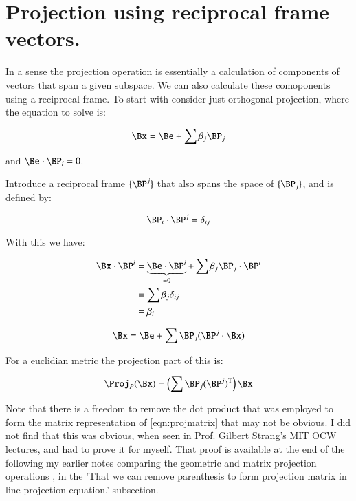 \documentclass{article}      %
\newcommand{\T}[0]{\text{T}}
\begin{document}
\section{ Projection using reciprocal frame vectors. }


In a sense the projection operation is essentially a calculation of components of vectors that span a given subspace.  We can also calculate these comoponents using a reciprocal frame.  To start with consider
just orthogonal projection, where the equation to solve is:

\begin{equation}
\Bx = \Be + \sum \beta_j \BP_j
\end{equation}

and $\Be \cdot \BP_i = 0$.

Introduce a reciprocal frame $\{\BP^j\}$ that also spans the space of $\{\BP_j\}$, and is defined by:

\[
\BP_i \cdot \BP^j = \delta_{ij}
\]

With this we have:

\begin{align*}
\Bx \cdot \BP^i
&= \underbrace{\Be \cdot \BP^i}_{=0} + \sum \beta_j \BP_j \cdot \BP^i \\
&= \sum \beta_j \delta_{ij} \\
&= \beta_i \\
\end{align*}

\begin{equation*}
\Bx = \Be + \sum \BP_j (\BP^j \cdot \Bx)
\end{equation*}

For a euclidian metric the projection part of this is:

\begin{equation}\label{eqn:projmatrix}
\Proj_P(\Bx) = \left( \sum \BP_j (\BP^j)^\T \right) \Bx
\end{equation}

Note that there is a freedom to remove the dot product that was employed
to form the matrix representation of \ref{eqn:projmatrix} that may not be obvious.
I did not find that this 
was obvious, when seen in Prof. Gilbert Strang's MIT OCW lectures, and 
had to prove it for myself.  That proof is available at the end of the 
following
my earlier notes
\cite{PJMatrixReview}
comparing the geometric and matrix projection operations 
, in the 'That we can remove parenthesis to form projection matrix in line projection equation.' subsection.
\end{document}
